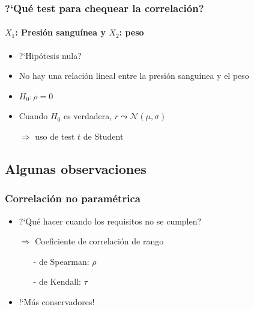 \documentclass[gray,handout,mathserif]{beamer}
\begin{document}
\begin{frame}[label=corrtest]
   \frametitle{?`Qu\'e test para chequear la correlaci\'on?}
   \framesubtitle{$X_1$: Presi\'on sangu\'inea y $X_2$: peso}
    \begin{itemize}[<+- | visible@+-| handout:1>]
      \item ?`Hip\'otesis nula?
      \item No hay una relaci\'on lineal entre la presi\'on sangu\'inea y el peso
      \item $H_0: \rho=0$
      \item Cuando $H_0$ es verdadera, $r\leadsto\mathcal{N}(\mu,\sigma)$
      \item[] $\Rightarrow$ uso de test $t$ de Student
   \end{itemize}
\end{frame}%


\subsection[Observaciones]{Algunas observaciones}

\begin{frame}[label=corrnopar]
   \frametitle{Correlaci\'on no param\'etrica}
    \begin{itemize}[<+-| handout:1>]
      \item ?`Qu\'e hacer cuando los requisitos no se cumplen?
      \medskip
      \item[$\Rightarrow$] Coeficiente de correlaci\'on de rango
         \begin{itemize} 
            \item[-] de Spearman: $\rho$
            \item[-] de Kendall: $\tau$
         \end{itemize}
      \item !`M\'as conservadores!
   \end{itemize}
\end{frame}%
\end{document}
